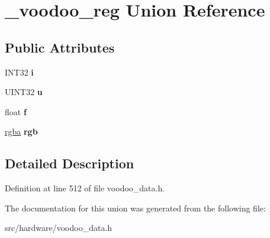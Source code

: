 \hypertarget{union__voodoo__reg}{\section{\-\_\-voodoo\-\_\-reg Union Reference}
\label{union__voodoo__reg}
}
\subsection*{Public Attributes}
\begin{DoxyCompactItemize}
\item 
\hypertarget{union__voodoo__reg_a63f2da448ca88c6c214cf5abf4df7778}{I\-N\-T32 {\bfseries i}}\label{union__voodoo__reg_a63f2da448ca88c6c214cf5abf4df7778}

\item 
\hypertarget{union__voodoo__reg_a921ea78859953f332cbd4f9f7291f4f4}{U\-I\-N\-T32 {\bfseries u}}\label{union__voodoo__reg_a921ea78859953f332cbd4f9f7291f4f4}

\item 
\hypertarget{union__voodoo__reg_a404d1c418bc264b40db5138829ef469e}{float {\bfseries f}}\label{union__voodoo__reg_a404d1c418bc264b40db5138829ef469e}

\item 
\hypertarget{union__voodoo__reg_a354c97e535735c9587507c3beb081be2}{\hyperlink{struct__rgba}{rgba} {\bfseries rgb}}\label{union__voodoo__reg_a354c97e535735c9587507c3beb081be2}

\end{DoxyCompactItemize}


\subsection{Detailed Description}


Definition at line 512 of file voodoo\-\_\-data.\-h.



The documentation for this union was generated from the following file\-:\begin{DoxyCompactItemize}
\item 
src/hardware/voodoo\-\_\-data.\-h\end{DoxyCompactItemize}
